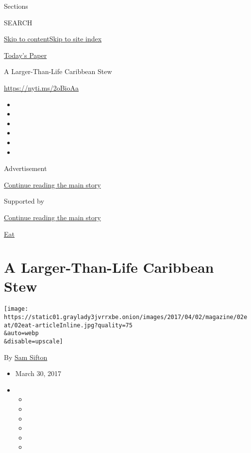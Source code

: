 Sections

SEARCH

\protect\hyperlink{site-content}{Skip to
content}\protect\hyperlink{site-index}{Skip to site index}

\href{https://myaccount.nytimes3xbfgragh.onion/auth/login?response_type=cookie\&client_id=vi}{}

\href{https://www.nytimes3xbfgragh.onion/section/todayspaper}{Today's
Paper}

A Larger-Than-Life Caribbean Stew

\url{https://nyti.ms/2oBioAa}

\begin{itemize}
\item
\item
\item
\item
\item
\item
\end{itemize}

Advertisement

\protect\hyperlink{after-top}{Continue reading the main story}

Supported by

\protect\hyperlink{after-sponsor}{Continue reading the main story}

\href{/column/magazine-eat}{Eat}

\hypertarget{a-larger-than-life-caribbean-stew}{%
\section{A Larger-Than-Life Caribbean
Stew}\label{a-larger-than-life-caribbean-stew}}

\texttt{[image: https://static01.graylady3jvrrxbe.onion/images/2017/04/02/magazine/02eat/02eat-articleInline.jpg?quality=75\\\&auto=webp\\\&disable=upscale]}

By \href{http://www.nytimes3xbfgragh.onion/by/sam-sifton}{Sam Sifton}

\begin{itemize}
\item
  March 30, 2017
\item
  \begin{itemize}
  \item
  \item
  \item
  \item
  \item
  \item
  \end{itemize}
\end{itemize}

